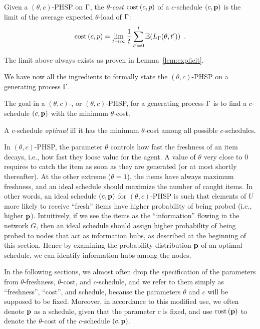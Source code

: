 \begin{definition}
	Given a $(\theta,c)$-PHSP on $\Gamma$, the $\theta$-\emph{cost} $\text{cost}\left( c,p \right)$
	of a $c$-schedule $(c,\mathbf{p})$ is the limit of the average expected
	$\theta$-load of $\Gamma$:
	\[
		\text{cost}\left( c,p \right)=\lim\limits_{t\rightarrow\infty}\frac{1}{t}\sum_{t'=0}^{t}\mathbb{E}(L_\Gamma(\theta,t'))\enspace.
	\]
\end{definition}
The limit above always exists as proven in Lemma~\ref{lem:explicit}.

We have now all the ingredients to formally state the $(\theta,c)$-PHSP on a
generating process $\Gamma$.

\begin{definition}[\probname]\label{def:phsp}
	The goal in a $(\theta,c)$-{\probname}, or $(\theta,c)$-PHSP, for a
	generating process $\Gamma$ is to find a $c$-schedule $(c,\mathbf{p})$ with the
	minimum $\theta$-cost.

	A $c$-schedule \emph{optimal} iff it has the minimum $\theta$-cost among all
	possible $c$-schedules.
\end{definition}

In $(\theta,c)$-PHSP, the parameter $\theta$ controls how fast the freshness of
an item decays, i.e., how fast they loose value for the agent. A value of
$\theta$ very close to $0$ requires to catch the item  as soon as they are
generated (or at most shortly thereafter). At the other extreme ($\theta=1$),
the items have always maximum freshness, and an ideal schedule should maximize
the number of caught items.  In other words, an ideal schedule $(c,\mathbf{p})$ for
$(\theta, c)$-PHSP is such that elements of $U$ more likely to receive ``fresh''
items have higher probability of being probed (i.e., higher $\mathbf{p}$). Intuitively,
if we see the items as the ``information'' flowing in the network $G$, then an
ideal schedule should assign higher probability of being probed to nodes that
act as information hubs, as described at the beginning of this section. Hence by
examining the probability distribution $\mathbf{p}$ of an optimal schedule, we can
identify information hubs among the nodes.

In the following sections, we almost often drop the specification of the
parameters from $\theta$-freshness, $\theta$-cost, and $c$-schedule, and we
refer to them simply as ``freshness'', ``cost'', and schedule, because the
parameters $\theta$ and $c$ will be supposed to be fixed. Moreover, in
accordance to this modified use, we often denote $\mathbf{p}$ as a schedule, given that
the parameter $c$ is fixed, and use $\text{cost}\left( \mathbf{p} \right)$ to denote the $\theta$-cost of
the $c$-schedule $(c,\mathbf{p})$.

